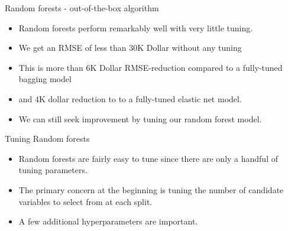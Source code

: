 \documentclass[
  10pt,
  ignorenonframetext,
]{beamer}
\providecommand{\tightlist}{%
  \setlength{\itemsep}{0pt}\setlength{\parskip}{0pt}}
\begin{document}
\begin{frame}{Random forests - out-of-the-box algorithm}
\protect\hypertarget{random-forests---out-of-the-box-algorithm}{}

\begin{itemize}
\tightlist
\item
  Random forests perform remarkably well with very little tuning.
\item
  We get an RMSE of less than 30K Dollar without any tuning
\item
  This is more than 6K Dollar RMSE-reduction compared to a fully-tuned
  bagging model
\item
  and 4K dollar reduction to to a fully-tuned elastic net model.
\item
  We can still seek improvement by tuning our random forest model.
\end{itemize}

\begin{block}{Tuning Random forests}

\begin{itemize}
\tightlist
\item
  Random forests are fairly easy to tune since there are only a handful
  of tuning parameters.
\item
  The primary concern at the beginning is tuning the number of candidate
  variables to select from at each split.
\item
  A few additional hyperparameters are important.
\end{itemize}

\end{block}

\end{frame}
\end{document}
